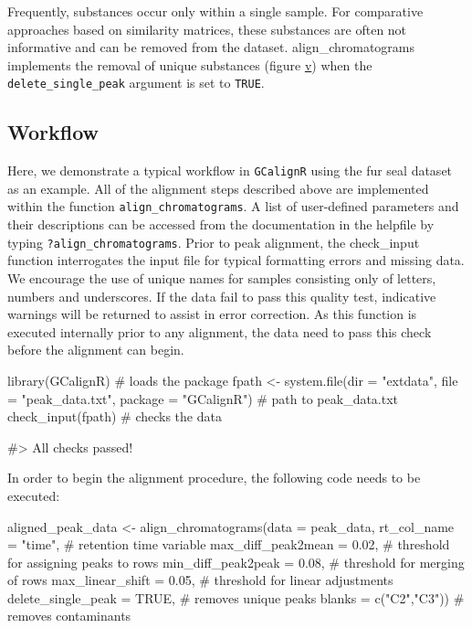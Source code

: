 Frequently, substances occur only within a single sample. For
comparative approaches based on similarity matrices, these substances
are often not informative and can be removed from the dataset.
align\_chromatograms implements the removal of unique substances (figure
\href{figure:algorithm} v) when the \texttt{delete\_single\_peak}
argument is set to \texttt{TRUE}.

\subsection{Workflow}\label{workflow}

Here, we demonstrate a typical workflow in \texttt{GCalignR} using the
fur seal dataset as an example. All of the alignment steps described
above are implemented within the function \texttt{align\_chromatograms}.
A list of user-defined parameters and their descriptions can be accessed
from the documentation in the helpfile by typing
\texttt{?align\_chromatograms}. Prior to peak alignment, the
check\_input function interrogates the input file for typical formatting
errors and missing data. We encourage the use of unique names for
samples consisting only of letters, numbers and underscores. If the data
fail to pass this quality test, indicative warnings will be returned to
assist in error correction. As this function is executed internally
prior to any alignment, the data need to pass this check before the
alignment can begin.

\begin{Schunk}
\begin{Sinput}
library(GCalignR) # loads the package 
fpath <- system.file(dir = "extdata",
                     file = "peak_data.txt",
                     package = "GCalignR") # path to peak_data.txt
check_input(fpath) # checks the data
\end{Sinput}
\begin{Soutput}
#> All checks passed!
\end{Soutput}
\end{Schunk}

In order to begin the alignment procedure, the following code needs to
be executed:

\begin{Schunk}
\begin{Sinput}
aligned_peak_data <- align_chromatograms(data = peak_data,
        rt_col_name = "time", # retention time variable
        max_diff_peak2mean = 0.02, # threshold for assigning peaks to rows
        min_diff_peak2peak = 0.08, # threshold for merging of rows
        max_linear_shift = 0.05, # threshold for linear adjustments
        delete_single_peak = TRUE, # removes unique peaks
        blanks = c("C2","C3")) # removes contaminants
\end{Sinput}
\end{Schunk}


